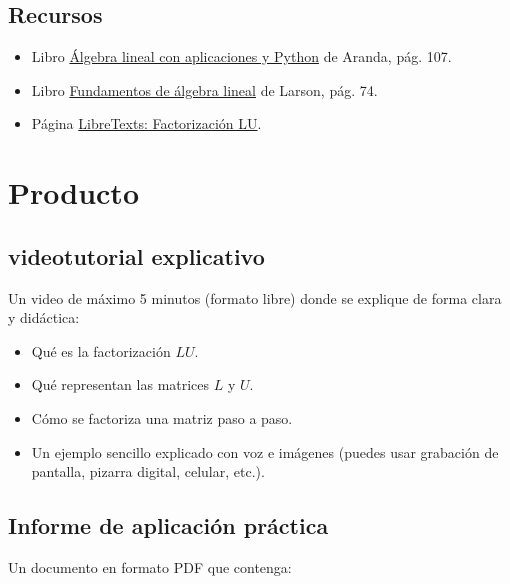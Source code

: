 \documentclass[a4,11pt]{aleph-notas}
\begin{document}
\subsection*{Recursos}  
\begin{itemize}[leftmargin=*]
\item Libro \href{https://puce.odilo.us/info/algebra-lineal-con-aplicaciones-y-python-03105595}{Álgebra lineal con aplicaciones y Python} de Aranda, pág. 107.
\item Libro \href{https://catalogobiblioteca.puce.edu.ec/cgi-bin/koha/opac-detail.pl?biblionumber=86081&query_desc=kw%2Cwrdl%3A%20larson}{Fundamentos de álgebra lineal} de Larson, pág. 74.
\item Página \href{https://espanol.libretexts.org/Matematicas/Algebra_lineal/Un_Primer_Curso_de_%C3%81lgebra_Lineal_(Kuttler)/02\%3A_Matrices/2.10\%3A_Factorizaci\%C3\%B3n_LU}{LibreTexts: Factorización LU}.
\end{itemize}

\section*{Producto}  

\subsection{videotutorial explicativo}  
Un video de máximo 5 minutos (formato libre) donde se explique de forma clara y didáctica:
\begin{itemize}[leftmargin=*]
\item Qué es la factorización $LU$.
\item Qué representan las matrices $L$ y $U$.
\item Cómo se factoriza una matriz paso a paso.
\item Un ejemplo sencillo explicado con voz e imágenes (puedes usar grabación de pantalla, pizarra digital, celular, etc.).
\end{itemize}

\subsection{Informe de aplicación práctica}  
Un documento en formato PDF que contenga:
\end{document}
